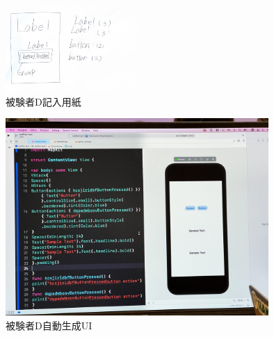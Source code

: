 

\begin{figure}[htbp]
  \begin{minipage}{\hsize}
    \begin{center}
       \includegraphics[width=50mm]{img/usertest_viewstructure_4.png}
    \end{center}
    \caption{被験者D記入用紙}
    \label{fig:usertest_viewstructure_4}
  \end{minipage}
\end{figure}

\begin{figure}[htbp]
  \begin{minipage}{\hsize}
    \begin{center}
       \includegraphics[width=100mm]{img/usertest_autogen_4.jpeg}
    \end{center}
    \caption{被験者D自動生成UI}
    \label{fig:usertest_autogen_4}
  \end{minipage}
\end{figure}


